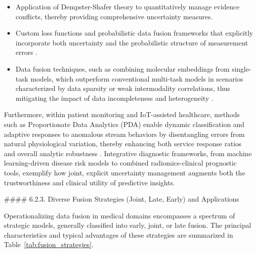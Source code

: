 \documentclass[11pt]{article}
\begin{document}
\begin{itemize}
    \item Application of Dempster-Shafer theory to quantitatively manage evidence conflicts, thereby providing comprehensive uncertainty measures.
    \item Custom loss functions and probabilistic data fusion frameworks that explicitly incorporate both uncertainty and the probabilistic structure of measurement errors \cite{ref73,ref76,ref77,ref84}.
    \item Data fusion techniques, such as combining molecular embeddings from single-task models, which outperform conventional multi-task models in scenarios characterized by data sparsity or weak intermodality correlations, thus mitigating the impact of data incompleteness and heterogeneity \cite{ref89}.
\end{itemize}

Furthermore, within patient monitoring and IoT-assisted healthcare, methods such as Proportionate Data Analytics (PDA) enable dynamic classification and adaptive responses to anomalous stream behaviors by disentangling errors from natural physiological variation, thereby enhancing both service response ratios and overall analytic robustness \cite{ref90}. Integrative diagnostic frameworks, from machine learning-driven disease risk models to combined radiomics-clinical prognostic tools, exemplify how joint, explicit uncertainty management augments both the trustworthiness and clinical utility of predictive insights.

#### 6.2.3. Diverse Fusion Strategies (Joint, Late, Early) and Applications

Operationalizing data fusion in medical domains encompasses a spectrum of strategic models, generally classified into early, joint, or late fusion. The principal characteristics and typical advantages of these strategies are summarized in Table~\ref{tab:fusion_strategies}.
\end{document}
